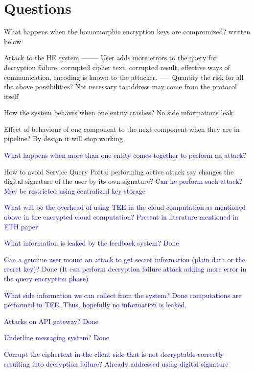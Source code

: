 \newpage
\section{Questions}
\begin{enumerate}
    \item What happens when the homomorphic encryption keys are compromized? written below
    \item Attack to the HE system -------- User adds more errors to the query for decryption failure, corrupted cipher text, corrupted result, effective ways of communication, encoding is known to the attacker.
          ----- Quantify the risk for all the above possibilities? Not necessary to address may come from the protocol itself
    \item How the system behaves when one entity crashes? No side informations leak
    \item Effect of behaviour of one component to the next component when they are in pipeline? By design it will stop working
          \textcolor{blue} {\item What happens when more than one entity comes together to perform an attack?}
    \item How to avoid Service Query Portal performing active attack say changes the digital signature of the user by its own signature? \textcolor{blue} {Can he perform such attack? May be restricted using centralized key storage}
          \textcolor{blue} {\item What will be the overhead of using TEE in the cloud computation as mentioned above in the encrypted cloud computation? Present in literature mentioned in ETH paper
    \item What information is leaked by the feedback system? Done
    \item Can a genuine user mount an attack to get secret information (plain data or the secret key)? Done (It can perform decryption failure attack adding more error in the query encryption phase)
    \item What side information we can collect from the system? Done computations are performed in TEE. Thus, hopefully no information is leaked.
    \item Attacks on API gateway? Done
    \item Underline messaging system? Done
    \item Corrupt the ciphertext in the client side that is not decryptable-correctly resulting into decryption failure? Already addressed using digital signature}
\end{enumerate}


